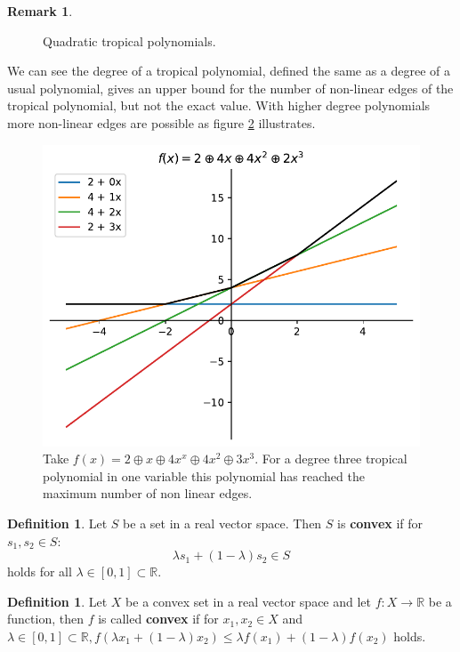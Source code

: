 \documentclass{article}
\theoremstyle{definition}
\newtheorem{definition}[theorem]{Definition}
\newtheorem{remark}[theorem]{Remark}
\begin{document}
\begin{remark}
\begin{figure}[h]
\caption{Quadratic tropical polynomials.}
\label{fig:image2}
\end{figure}

We can see the degree of a tropical polynomial, defined the same as a degree of a usual polynomial, gives an upper bound for the number of non-linear edges of the tropical polynomial, but not the exact value. With higher degree polynomials more non-linear edges are possible as figure \ref{fig:trop_qub} illustrates.


\begin{figure}[h]
\centering
\includegraphics[scale=0.75]{graphics/third_trop_pol.pdf}
\caption{Take $f(x)=2 \oplus x \oplus 4x^{x} \oplus 4x^{2} \oplus 3x^{3}$. For a degree three tropical polynomial in one variable this polynomial has reached the maximum number of non linear edges.}
\label{fig:trop_qub}
\end{figure}
\end{remark}



\begin{definition}
Let $S$ be a set in a real vector space. Then $S$ is \textbf{convex} if for $s_{1}, s_{2} \in S$: 
$$\lambda s_{1} + (1-\lambda) s_{2} \in S$$
holds for all $\lambda \in [0,1] \subset \mathbb{R}$.
\end{definition}

\begin{definition}
Let $X$ be a convex set in a real vector space and let $f:X \to \mathbb{R}$ be a function, then $f$ is called \textbf{convex} if for $x_{1}, x_{2} \in X$ and $\lambda \in [0,1] \subset \mathbb{R}, f(\lambda x_{1} + (1-\lambda)x_{2}) \leq \lambda f(x_{1}) + (1-\lambda)f(x_{2})$ holds.
\end{definition}
\end{document}
